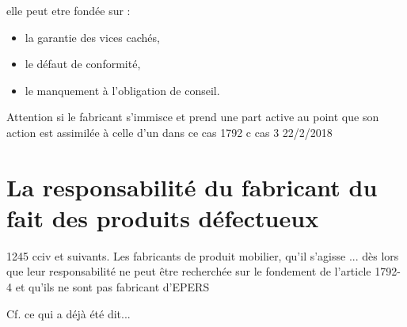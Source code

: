 		elle peut etre fondée sur :
			\begin{itemize}
				\item la garantie des vices cachés,
				\item le défaut de conformité,
				\item le manquement à l'obligation de conseil.
			\end{itemize}

		Attention si le fabricant s'immisce et prend une part active au point que son action est assimilée à celle d'un \Moe dans ce cas 1792 c cas 3 22/2/2018

\section{La responsabilité du fabricant du fait des produits défectueux}

	1245 cciv et suivants. Les fabricants de produit mobilier, qu'il s'agisse ... dès lors que leur responsabilité ne peut être recherchée sur le fondement de l'article 1792-4 et qu'ils ne sont pas fabricant d'EPERS

	Cf. ce qui a déjà été dit...
